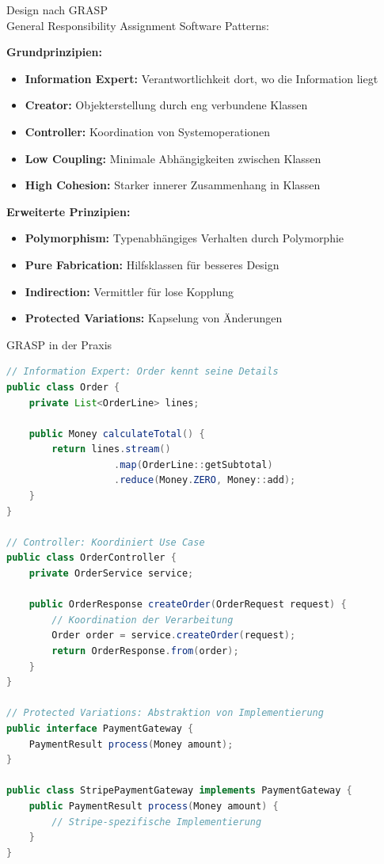 \begin{concept}{Design nach GRASP}\\
General Responsibility Assignment Software Patterns:

\textbf{Grundprinzipien:}
\begin{itemize}
    \item \textbf{Information Expert:} Verantwortlichkeit dort, wo die Information liegt
    \item \textbf{Creator:} Objekterstellung durch eng verbundene Klassen
    \item \textbf{Controller:} Koordination von Systemoperationen
    \item \textbf{Low Coupling:} Minimale Abhängigkeiten zwischen Klassen
    \item \textbf{High Cohesion:} Starker innerer Zusammenhang in Klassen
\end{itemize}

\textbf{Erweiterte Prinzipien:}
\begin{itemize}
    \item \textbf{Polymorphism:} Typenabhängiges Verhalten durch Polymorphie
    \item \textbf{Pure Fabrication:} Hilfsklassen für besseres Design
    \item \textbf{Indirection:} Vermittler für lose Kopplung
    \item \textbf{Protected Variations:} Kapselung von Änderungen
\end{itemize}
\end{concept}

\begin{example2}{GRASP in der Praxis}\\
\begin{lstlisting}[language=Java, style=base]
// Information Expert: Order kennt seine Details
public class Order {
    private List<OrderLine> lines;
    
    public Money calculateTotal() {
        return lines.stream()
                   .map(OrderLine::getSubtotal)
                   .reduce(Money.ZERO, Money::add);
    }
}

// Controller: Koordiniert Use Case
public class OrderController {
    private OrderService service;
    
    public OrderResponse createOrder(OrderRequest request) {
        // Koordination der Verarbeitung
        Order order = service.createOrder(request);
        return OrderResponse.from(order);
    }
}

// Protected Variations: Abstraktion von Implementierung
public interface PaymentGateway {
    PaymentResult process(Money amount);
}

public class StripePaymentGateway implements PaymentGateway {
    public PaymentResult process(Money amount) {
        // Stripe-spezifische Implementierung
    }
}
\end{lstlisting}
\end{example2}

